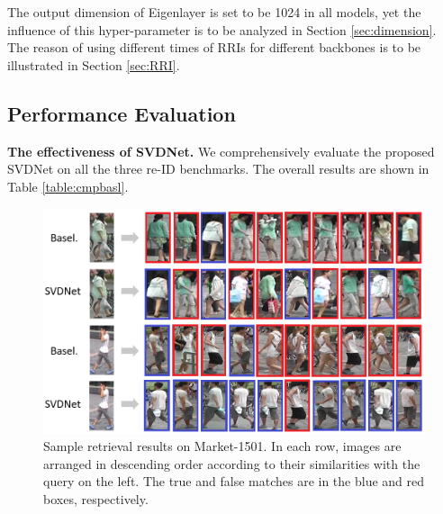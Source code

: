 \documentclass[10pt,twocolumn,letterpaper]{article}
\begin{document}
The output dimension of Eigenlayer is set to be 1024 in all models, yet the influence of this hyper-parameter is to be analyzed in Section \ref{sec:dimension}. The reason of using different times of RRIs for different backbones is to be illustrated in Section \ref{sec:RRI}.

\subsection{Performance Evaluation}\label{sec:evaluation}
\textbf{The effectiveness of SVDNet.} We comprehensively evaluate the proposed SVDNet on all the three re-ID benchmarks. The overall results are shown in Table \ref{table:cmpbasl}.

\begin{figure}[t]
\begin{center}
\includegraphics[width=1\linewidth]{retrieval_examples.PNG}
\end{center}
\setlength{\abovecaptionskip}{-0cm} 
   \caption{Sample retrieval results on Market-1501. In each row, images are arranged in descending order according to their similarities with the query on the left. The true and false matches are in the blue and red boxes, respectively.} 
\label{fig:examples}
\end{figure}
\end{document}
